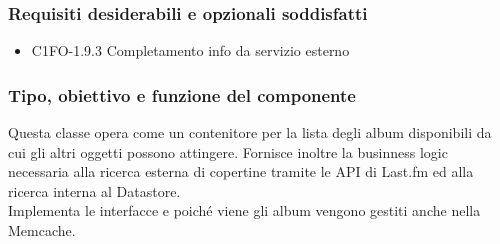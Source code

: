 \subsubsection*{Requisiti desiderabili e opzionali soddisfatti}
\begin{itemize}
    \item C1FO-1.9.3 Completamento info da servizio esterno
\end{itemize}
\subsubsection*{Tipo, obiettivo e funzione del componente} Questa classe opera
come un contenitore per la lista degli album disponibili da cui gli altri
oggetti possono attingere. Fornisce inoltre la businness logic necessaria alla
ricerca esterna di copertine tramite le API di Last.fm ed alla ricerca interna
al Datastore.\\
Implementa le interfacce  e  poich\'e viene gli
album vengono gestiti anche nella Memcache. 
